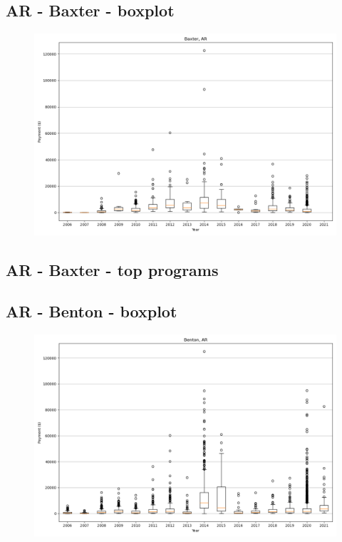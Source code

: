 \subsection*{AR - Baxter - boxplot}
\begin{figure}[h]
\centering
\includegraphics[width=7in]{../output/boxplots/counties/Baxter-AR_boxplot.png}
\end{figure}


\subsection*{AR - Baxter - top programs}

\newpage
\subsection*{AR - Benton - boxplot}
\begin{figure}[h]
\centering
\includegraphics[width=7in]{../output/boxplots/counties/Benton-AR_boxplot.png}
\end{figure}


